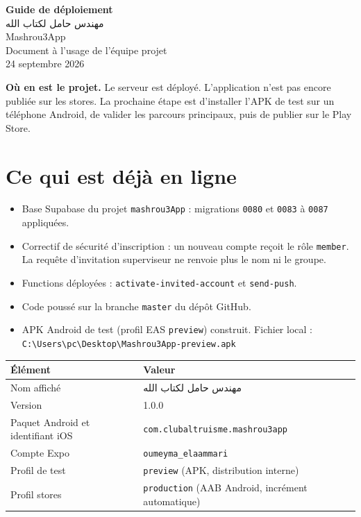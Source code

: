 \documentclass[11pt,a4paper]{article}
\newcommand{\code}[1]{\texttt{#1}}
\newcommand{\pkg}{\code{com.clubaltruisme.mashrou3app}}
\begin{document}
\begin{center}
  {\LARGE\bfseries\color{accent} Guide de déploiement}\\[0.45em]
  {\Large مهندس حامل لكتاب الله}\\[0.25em]
  {\large Mashrou3App}\\[0.8em]
  {\color{ink!75} Document à l'usage de l'équipe projet}\\[0.25em]
  {\color{ink!75} 24 septembre 2026}
\end{center}

\vspace{0.6em}
\noindent\colorbox{soft}{\parbox{\dimexpr\linewidth-2\fboxsep}{
\textbf{Où en est le projet.} Le serveur est déployé. L'application n'est pas encore publiée sur les stores. La prochaine étape est d'installer l'APK de test sur un téléphone Android, de valider les parcours principaux, puis de publier sur le Play Store.
}}

\tableofcontents
\vspace{1em}

\section{Ce qui est déjà en ligne}

\begin{itemize}
  \item Base Supabase du projet \code{mashrou3App} : migrations \code{0080} et \code{0083} à \code{0087} appliquées.
  \item Correctif de sécurité d'inscription : un nouveau compte reçoit le rôle \code{member}. La requête d'invitation superviseur ne renvoie plus le nom ni le groupe.
  \item Functions déployées : \code{activate-invited-account} et \code{send-push}.
  \item Code poussé sur la branche \code{master} du dépôt GitHub.
  \item APK Android de test (profil EAS \code{preview}) construit. Fichier local :\\
        \code{C:\textbackslash Users\textbackslash pc\textbackslash Desktop\textbackslash Mashrou3App-preview.apk}
\end{itemize}

\begin{center}
\begin{tabularx}{\linewidth}{@{}l X@{}}
\toprule
\textbf{Élément} & \textbf{Valeur} \\
\midrule
Nom affiché & مهندس حامل لكتاب الله \\
Version & 1.0.0 \\
Paquet Android et identifiant iOS & \pkg \\
Compte Expo & \code{oumeyma\_elaammari} \\
Profil de test & \code{preview} (APK, distribution interne) \\
Profil stores & \code{production} (AAB Android, incrément automatique) \\
\bottomrule
\end{tabularx}
\end{center}
\end{document}
